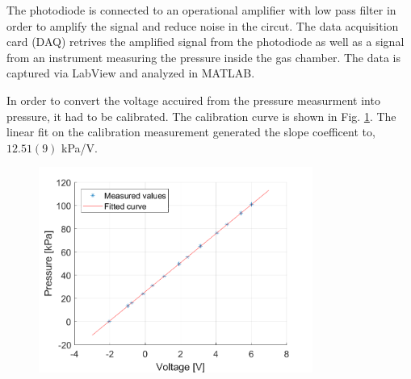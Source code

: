 The photodiode is connected to an operational amplifier with low pass filter in order to amplify the signal and reduce noise in the circut. The data acquisition card (DAQ) retrives the amplified signal from the photodiode as well as a signal from an instrument measuring the pressure inside the gas chamber. The data is captured via LabView and analyzed in MATLAB.

In order to convert the voltage accuired from the pressure measurment into pressure, it had to be calibrated. The calibration curve is shown in Fig. \ref{fig:calibration}. The linear fit on the calibration measurement generated the slope coefficent to, $12.51(9)$ kPa/V. 


\begin{figure}[H]
  \centering
  \includegraphics[width=0.8\textwidth]{matlab/calibration.png}
  \caption{}
  \label{fig:calibration}
\end{figure}
